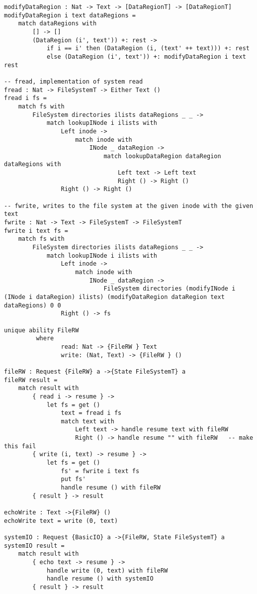 \documentclass[logo,bsc,singlespacing,parskip]{infthesis}
\begin{document}
\begin{lstlisting}[language=unison]
modifyDataRegion : Nat -> Text -> [DataRegionT] -> [DataRegionT]
modifyDataRegion i text dataRegions =
    match dataRegions with
        [] -> []
        (DataRegion (i', text')) +: rest ->
            if i == i' then (DataRegion (i, (text' ++ text))) +: rest
            else (DataRegion (i', text')) +: modifyDataRegion i text rest

-- fread, implementation of system read
fread : Nat -> FileSystemT -> Either Text ()
fread i fs =
    match fs with
        FileSystem directories ilists dataRegions _ _ ->
            match lookupINode i ilists with
                Left inode ->
                    match inode with
                        INode _ dataRegion ->
                            match lookupDataRegion dataRegion dataRegions with
                                Left text -> Left text
                                Right () -> Right ()
                Right () -> Right ()

-- fwrite, writes to the file system at the given inode with the given text
fwrite : Nat -> Text -> FileSystemT -> FileSystemT
fwrite i text fs =
    match fs with
        FileSystem directories ilists dataRegions _ _ ->
            match lookupINode i ilists with
                Left inode ->
                    match inode with
                        INode _ dataRegion ->
                            FileSystem directories (modifyINode i (INode i dataRegion) ilists) (modifyDataRegion dataRegion text dataRegions) 0 0
                Right () -> fs

unique ability FileRW
         where
                read: Nat -> {FileRW } Text
                write: (Nat, Text) -> {FileRW } ()

fileRW : Request {FileRW} a ->{State FileSystemT} a
fileRW result =
    match result with
        { read i -> resume } ->
            let fs = get ()
                text = fread i fs
                match text with
                    Left text -> handle resume text with fileRW
                    Right () -> handle resume "" with fileRW   -- make this fail
        { write (i, text) -> resume } ->
            let fs = get ()
                fs' = fwrite i text fs
                put fs'
                handle resume () with fileRW
        { result } -> result

echoWrite : Text ->{FileRW} ()
echoWrite text = write (0, text)

systemIO : Request {BasicIO} a ->{FileRW, State FileSystemT} a
systemIO result =
    match result with
        { echo text -> resume } ->
            handle write (0, text) with fileRW
            handle resume () with systemIO
        { result } -> result


\end{lstlisting}
\end{document}
